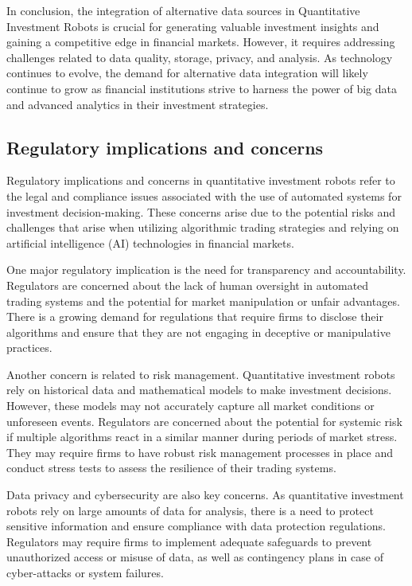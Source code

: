 \documentclass[UTF8]{ctexart}
\begin{document}
In conclusion, the integration of alternative data sources in Quantitative Investment Robots is crucial for generating valuable investment insights and gaining a competitive edge in financial markets. However, it requires addressing challenges related to data quality, storage, privacy, and analysis. As technology continues to evolve, the demand for alternative data integration will likely continue to grow as financial institutions strive to harness the power of big data and advanced analytics in their investment strategies.

\subsection{Regulatory implications and concerns}
Regulatory implications and concerns in quantitative investment robots refer to the legal and compliance issues associated with the use of automated systems for investment decision-making. These concerns arise due to the potential risks and challenges that arise when utilizing algorithmic trading strategies and relying on artificial intelligence (AI) technologies in financial markets.

One major regulatory implication is the need for transparency and accountability. Regulators are concerned about the lack of human oversight in automated trading systems and the potential for market manipulation or unfair advantages. There is a growing demand for regulations that require firms to disclose their algorithms and ensure that they are not engaging in deceptive or manipulative practices.

Another concern is related to risk management. Quantitative investment robots rely on historical data and mathematical models to make investment decisions. However, these models may not accurately capture all market conditions or unforeseen events. Regulators are concerned about the potential for systemic risk if multiple algorithms react in a similar manner during periods of market stress. They may require firms to have robust risk management processes in place and conduct stress tests to assess the resilience of their trading systems.

Data privacy and cybersecurity are also key concerns. As quantitative investment robots rely on large amounts of data for analysis, there is a need to protect sensitive information and ensure compliance with data protection regulations. Regulators may require firms to implement adequate safeguards to prevent unauthorized access or misuse of data, as well as contingency plans in case of cyber-attacks or system failures.
\end{document}
